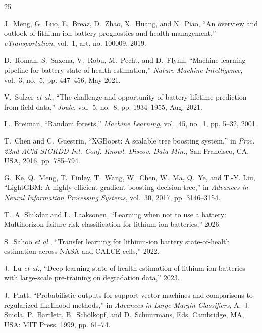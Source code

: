 \begin{thebibliography}{25}

J.~Meng, G.~Luo, E.~Breaz, D.~Zhao, X.~Huang, and N.~Piao, ``An overview and outlook of lithium-ion battery prognostics and health management,'' \emph{eTransportation}, vol.~1, art. no. 100009, 2019.

D.~Roman, S.~Saxena, V.~Robu, M.~Pecht, and D.~Flynn, ``Machine learning pipeline for battery state-of-health estimation,'' \emph{Nature Machine Intelligence}, vol.~3, no.~5, pp. 447--456, May 2021.

V.~Sulzer \emph{et al.}, ``The challenge and opportunity of battery lifetime prediction from field data,'' \emph{Joule}, vol.~5, no.~8, pp. 1934--1955, Aug. 2021.

L.~Breiman, ``Random forests,'' \emph{Machine Learning}, vol.~45, no.~1, pp. 5--32, 2001.

T.~Chen and C.~Guestrin, ``XGBoost: A scalable tree boosting system,'' in \emph{Proc. 22nd ACM SIGKDD Int. Conf. Knowl. Discov. Data Min.}, San Francisco, CA, USA, 2016, pp. 785--794.

G.~Ke, Q.~Meng, T.~Finley, T.~Wang, W.~Chen, W.~Ma, Q.~Ye, and T.-Y. Liu, ``LightGBM: A highly efficient gradient boosting decision tree,'' in \emph{Advances in Neural Information Processing Systems}, vol.~30, 2017, pp. 3146--3154.

T.~A. Shikdar and L.~Laaksonen, ``Learning when not to use a battery: Multihorizon failure-risk classification for lithium-ion batteries,'' 2026.

S.~Sahoo \emph{et al.}, ``Transfer learning for lithium-ion battery state-of-health estimation across NASA and CALCE cells,'' 2022. %

J.~Lu \emph{et al.}, ``Deep-learning state-of-health estimation of lithium-ion batteries with large-scale pre-training on degradation data,'' 2023. %

J.~Platt, ``Probabilistic outputs for support vector machines and comparisons to regularized likelihood methods,'' in \emph{Advances in Large Margin Classifiers}, A.~J. Smola, P.~Bartlett, B.~Sch\"olkopf, and D.~Schuurmans, Eds. Cambridge, MA, USA: MIT Press, 1999, pp. 61--74.


\end{thebibliography}
